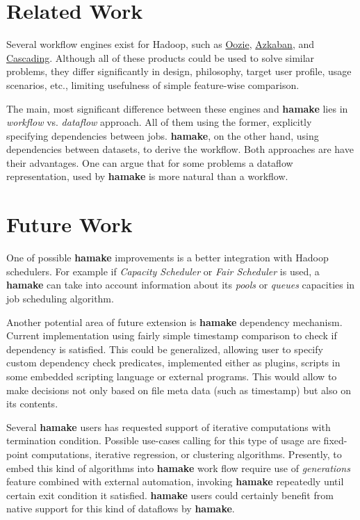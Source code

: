 \documentclass[10pt,conference,letterpaper]{IEEEtran}
\begin{document}
\section{Related Work}

Several workflow engines exist for Hadoop, such as
\href{http://github.com/tucu00/oozie1}{Oozie},
\href{http://sna-projects.com/azkaban/}{Azkaban}, and
\href{http://www.cascading.org/}{Cascading}.  Although all of these
products could be used to solve similar problems, they differ
significantly in design, philosophy, target user profile, usage
scenarios, etc., limiting usefulness of simple feature-wise
comparison.

The main, most significant difference between these engines and \textbf{hamake}
lies in \textit{workflow} vs. \textit{dataflow} approach. All of them
using the former, explicitly specifying dependencies between
jobs. \textbf{hamake}, on the other hand, using dependencies between datasets,
to derive the workflow. Both approaches are have their advantages. One
can argue that for some problems a dataflow representation, used by
\textbf{hamake} is more natural than a workflow.

\section{Future Work}

One of possible \textbf{hamake} improvements is a better integration with
Hadoop schedulers. For example if \textit{Capacity Scheduler} or
\textit{Fair Scheduler} is used, a \textbf{hamake} can take into account
information about its \textit{pools} or \textit{queues} capacities in
job scheduling algorithm.

Another potential area of future extension is \textbf{hamake} dependency
mechanism. Current implementation using fairly simple timestamp
comparison to check if dependency is satisfied. This could be
generalized, allowing user to specify custom dependency check
predicates, implemented either as plugins, scripts in some embedded
scripting language or external programs. This would allow to make
decisions not only based on file meta data (such as timestamp) but
also on its contents.

Several \textbf{hamake} users has requested support of iterative computations
with termination condition. Possible use-cases calling for this type
of usage are fixed-point computations, iterative regression, or
clustering algorithms. Presently, to embed this kind of algorithms
into \textbf{hamake} work flow require use of \textit{generations} feature
combined with external automation, invoking \textbf{hamake} repeatedly until
certain exit condition it satisfied. \textbf{hamake} users could
certainly benefit from native support for this kind of dataflows by
\textbf{hamake}.

\nocite{*}


\end{document}
